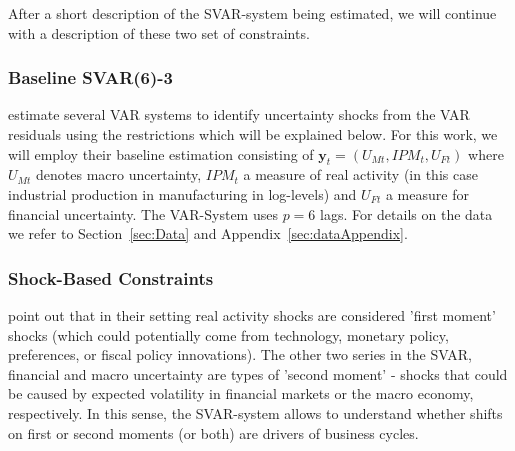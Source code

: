 \documentclass[a4paper,11pt,listof=nochaptergap,oneside,pointednumbers,bibtotoc,bigheadings,liststotoc,hidelinks]{scrbook}
\theoremstyle{mysatz}
\theoremstyle{mydefinition}
\theoremstyle{mytheorem}
\theoremstyle{mybemerkung}
\newcommand{\vect}[1]{\boldsymbol{\mathbf{#1}}}
\begin{document}
After a short description of the SVAR-system being estimated, we will continue with a description of these two set of constraints.

\subsubsection{Baseline SVAR(6)-3}
\citet{ludvigsonetal:18,ludvigsonetal:19} estimate several VAR systems to identify uncertainty shocks from the VAR residuals using the restrictions which will be explained below. For this work, we will employ their baseline estimation consisting of $\vect{y}_t = (U_{Mt}, IPM_{t}, U_{Ft})$ where $U_{Mt}$ denotes macro uncertainty, $IPM_{t}$ a measure of real activity (in this case industrial production in manufacturing in log-levels) and $U_{Ft}$ a measure for financial uncertainty. The VAR-System uses $p=6$ lags. For details on the data we refer to Section~\ref{sec:Data} and Appendix~\ref{sec:dataAppendix}.

\subsubsection{Shock-Based Constraints}
\citet{ludvigsonetal:18,ludvigsonetal:19} point out that in their setting real activity shocks are considered 'first moment' shocks (which could potentially come from technology, monetary policy, preferences, or fiscal policy innovations). The other two series in the SVAR, financial and macro uncertainty are types of 'second moment' - shocks that could be caused by expected volatility in financial markets or the macro economy, respectively. In this sense, the SVAR-system allows to understand whether shifts on first or second moments (or both) are drivers of business cycles.
\end{document}
